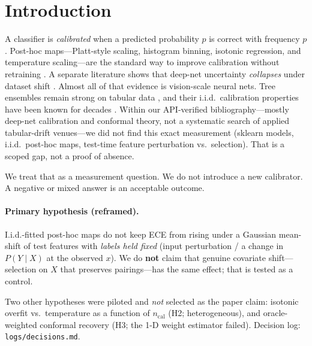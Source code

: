 \documentclass[10pt,twocolumn]{article}
\begin{document}
\section{Introduction}
A classifier is \emph{calibrated} when a predicted probability $p$ is
correct with frequency $p$. Post-hoc maps---Platt-style scaling, histogram
binning, isotonic regression, and temperature scaling---are the standard
way to improve calibration without retraining
\cite{zadrozny2002multiclass,niculescumizil2005probabilities,guo2017calibration}.
A separate literature shows that deep-net uncertainty \emph{collapses}
under dataset shift \cite{ovadia2019trust,minderer2021revisiting,tomani2021posthoc}.
Almost all of that evidence is vision-scale neural nets. Tree ensembles
remain strong on tabular data \cite{grinsztajn2022trees}, and their
i.i.d.\ calibration properties have been known for decades
\cite{niculescumizil2005probabilities}. Within our API-verified bibliography---mostly deep-net calibration and
conformal theory, not a systematic search of applied tabular-drift
venues---we did not find this exact measurement (sklearn models, i.i.d.\ post-hoc maps, test-time
feature perturbation vs.\ selection). That is a scoped gap, not a proof
of absence.

We treat that as a measurement question. We do not introduce a new
calibrator. A negative or mixed answer is an acceptable outcome.

\paragraph{Primary hypothesis (reframed).}
I.i.d.-fitted post-hoc maps do not keep ECE from rising under a Gaussian
mean-shift of test features with \emph{labels held fixed} (input
perturbation / a change in $P(Y\mid X)$ at the observed $x$). We do
\textbf{not} claim that genuine covariate shift---selection on $X$ that
preserves pairings---has the same effect; that is tested as a control.

Two other hypotheses were piloted and \emph{not} selected as the paper
claim: isotonic overfit vs.\ temperature as a function of $n_{\mathrm{cal}}$
(H2; heterogeneous), and oracle-weighted conformal recovery (H3; the 1-D
weight estimator failed). Decision log: \texttt{logs/decisions.md}.
\end{document}

